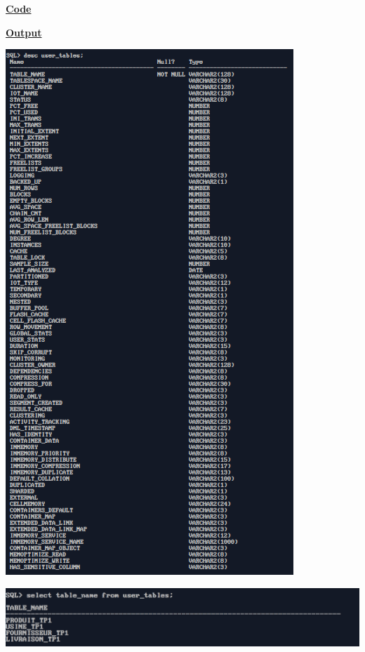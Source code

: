 \newpage
{}
\textbf{\underline{Code}}


\vspace{1cm}
\textbf{\underline{Output}}
\vspace{1cm}
\begin{center}
    \includegraphics[height=0.5\textheight]{Questions/q4/desc.png}
    
    \vspace{0.25cm}
    
    \includegraphics[height=0.15\textheight]{Questions/q4/name.png}
\end{center}





